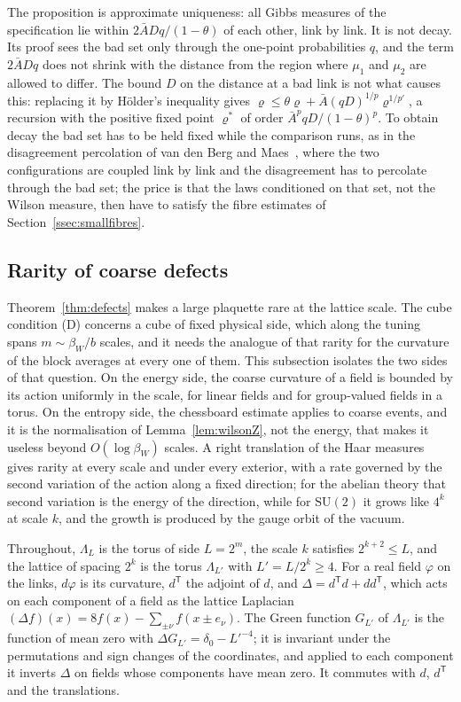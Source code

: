 \documentclass[11pt]{amsart}
\theoremstyle{definition}
\theoremstyle{remark}
\numberwithin{equation}{section}
\newcommand{\SU}{\mathrm{SU}}
\begin{document}
The proposition is approximate uniqueness: all Gibbs measures of the
specification lie within $2\bar ADq/(1-\theta)$ of each other, link by
link. It is not decay. Its proof sees the bad set only through the
one-point probabilities $q$, and the term $2\bar ADq$ does not shrink with
the distance from the region where $\mu_1$ and $\mu_2$ are allowed to
differ. The bound $D$ on the distance at a bad link is not what causes
this: replacing it by H\"older's inequality gives $\varrho\le\theta\varrho
+\bar A(qD)^{1/p}\varrho^{1/p'}$, a recursion with the positive fixed point
$\varrho^*$ of order $\bar A^pqD/(1-\theta)^p$. To obtain decay the bad set
has to be held fixed while the comparison runs, as in the disagreement
percolation of van den Berg and Maes~\cite{vdBM94}, where the two
configurations are coupled link by link and the disagreement has to
percolate through the bad set; the price is that the laws conditioned on
that set, not the Wilson measure, then have to satisfy the fibre estimates
of Section~\ref{ssec:smallfibres}.

\subsection{Rarity of coarse defects}\label{ssec:coarse}

Theorem~\ref{thm:defects} makes a large plaquette rare at the lattice
scale. The cube condition (D) concerns a cube of fixed physical side, which
along the tuning spans $m\sim\beta_W/b$ scales, and it needs the analogue
of that rarity for the curvature of the block averages at every one of
them. This subsection isolates the two sides of that question. On the
energy side, the coarse curvature of a field is bounded by its action
uniformly in the scale, for linear fields and for group-valued fields in a
torus. On the entropy side, the chessboard estimate applies to coarse
events, and it is the normalisation of Lemma~\ref{lem:wilsonZ}, not the
energy, that makes it useless beyond $O(\log\beta_W)$ scales. A right
translation of the Haar measures gives rarity at every scale and under
every exterior, with a rate governed by the second variation of the action
along a fixed direction; for the abelian theory that second variation is
the energy of the direction, while for $\SU(2)$ it grows like $4^k$ at
scale $k$, and the growth is produced by the gauge orbit of the vacuum.

Throughout, $\Lambda_L$ is the torus of side $L=2^m$, the scale $k$
satisfies $2^{k+2}\le L$, and the lattice of spacing $2^k$ is the torus
$\Lambda_{L'}$ with $L'=L/2^k\ge4$. For a real field $\varphi$ on the links,
$d\varphi$ is its curvature, $d^{\mathsf T}$ the adjoint of $d$, and
$\Delta=d^{\mathsf T}d+dd^{\mathsf T}$, which acts on each component of a
field as the lattice Laplacian $(\Delta f)(x)=8f(x)-\sum_{\pm\nu}f(x\pm
e_\nu)$. The Green function $G_{L'}$ of $\Lambda_{L'}$ is the function of
mean zero with $\Delta G_{L'}=\delta_0-L'^{-4}$; it is invariant under the
permutations and sign changes of the coordinates, and applied to each
component it inverts $\Delta$ on fields whose components have mean zero.
It commutes with $d$, $d^{\mathsf T}$ and the translations.
\end{document}
